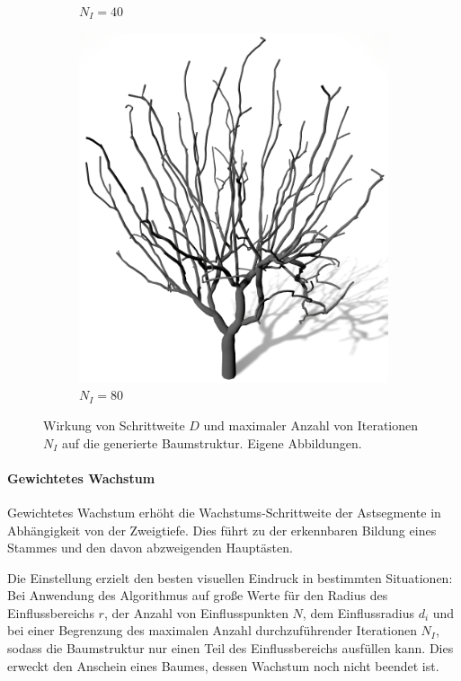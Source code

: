 \begin{figure} [hbtp]
\begin{subfigure}[t]{.2\textwidth}
		\caption{$N_I = 40$}
		\label{subfig:SCA_SI_Iterationen40}
	\end{subfigure}
	\begin{subfigure}[t]{.35\textwidth}
		\centering
		\includegraphics[height=.21\textheight]{images/SCA_SI_Iterationen80.png}
		\caption{$N_I = 80$}
		\label{subfig:SCA_SI_Iterationen80}
	\end{subfigure}
	\caption{Wirkung von Schrittweite $D$ und maximaler Anzahl von Iterationen $N_I$ auf die generierte Baumstruktur. Eigene Abbildungen.}
	\label{fig:SCA_SI}
\end{figure}


\paragraph{Gewichtetes Wachstum}

Gewichtetes Wachstum erhöht die Wachstums-Schrittweite der Astsegmente in Abhängigkeit von der Zweigtiefe. Dies führt zu der erkennbaren Bildung eines Stammes und den davon abzweigenden Hauptästen. 

Die Einstellung erzielt den besten visuellen Eindruck in bestimmten Situationen: Bei Anwendung des Algorithmus auf große Werte für den Radius des Einflussbereichs $r$, der Anzahl von Einflusspunkten $N$, dem Einflussradius $d_i$ und bei einer Begrenzung des maximalen Anzahl durchzuführender Iterationen $N_I$, sodass die Baumstruktur nur einen Teil des Einflussbereichs ausfüllen kann. Dies erweckt den Anschein eines Baumes, dessen Wachstum noch nicht beendet ist.

